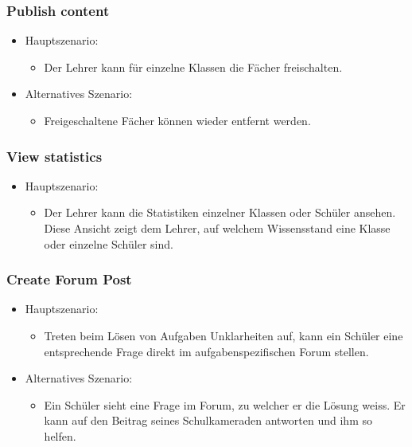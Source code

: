\subsubsection*{Publish content}
\begin{itemize}
	\item Hauptszenario:
	\begin{itemize}
		\item Der Lehrer kann für einzelne Klassen die Fächer freischalten.
	\end{itemize}
	\item Alternatives Szenario:
	\begin{itemize}
		\item Freigeschaltene Fächer können wieder entfernt werden.
	\end{itemize}
\end{itemize}



\subsubsection*{View statistics}
\begin{itemize}
	\item Hauptszenario:
	\begin{itemize}
		\item Der Lehrer kann die Statistiken einzelner Klassen oder Schüler ansehen. Diese Ansicht zeigt dem Lehrer, auf welchem Wissensstand eine Klasse oder einzelne Schüler sind.
	\end{itemize}
\end{itemize}


\subsubsection*{Create Forum Post}
\begin{itemize}
	\item Hauptszenario:
	\begin{itemize}
		\item Treten beim Lösen von Aufgaben Unklarheiten auf, kann ein Schüler eine entsprechende Frage direkt im aufgabenspezifischen Forum stellen.
	\end{itemize}
	\item Alternatives Szenario:
	\begin{itemize}
		\item Ein Schüler sieht eine Frage im Forum, zu welcher er die Lösung weiss. Er kann auf den Beitrag seines Schulkameraden antworten und ihm so helfen.
	\end{itemize}
\end{itemize}


